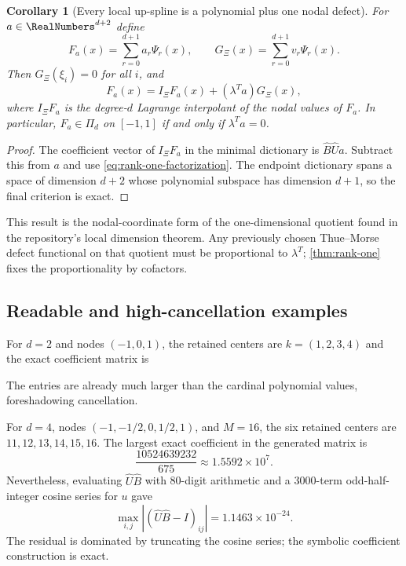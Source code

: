 \documentclass[11pt]{article}
\newtheorem{corollary}[theorem]{Corollary}
\theoremstyle{definition}
\theoremstyle{remark}
\newcommand{\PiD}{\Pi_d}
\begin{document}
\begin{corollary}[Every local up-spline is a polynomial plus one nodal defect]
\label{cor:functional-defect}
For $a\in\RealNumbers^{d+2}$ define
\[
 F_a(x)=\sum_{r=0}^{d+1}a_r\Psi_r(x),
 \qquad
 G_\Xi(x)=\sum_{r=0}^{d+1}v_r\Psi_r(x).
\]
Then $G_\Xi(\xi_i)=0$ for all $i$, and
\begin{equation}
 \boxed{
 F_a(x)=I_\Xi F_a(x)+(\lambda^Ta)G_\Xi(x),}
 \label{eq:functional-defect}
\end{equation}
where $I_\Xi F_a$ is the degree-$d$ Lagrange interpolant of the nodal values of
$F_a$.  In particular, $F_a\in\PiD$ on $[-1,1]$ if and only if
$\lambda^Ta=0$.
\end{corollary}

\begin{proof}
The coefficient vector of $I_\Xi F_a$ in the minimal dictionary is
$\widehat B\widehat Ua$.  Subtract this from $a$ and use
\eqref{eq:rank-one-factorization}.  The endpoint dictionary spans a space of
dimension $d+2$ whose polynomial subspace has dimension $d+1$, so the final
criterion is exact.
\end{proof}

This result is the nodal-coordinate form of the one-dimensional quotient found
in the repository's local dimension theorem.  Any previously chosen
Thue--Morse defect functional on that quotient must be proportional to
$\lambda^T$; \cref{thm:rank-one} fixes the proportionality by cofactors.

\subsection{Readable and high-cancellation examples}

For $d=2$ and nodes $(-1,0,1)$, the retained centers are $k=(1,2,3,4)$ and the
exact coefficient matrix is

The entries are already much larger than the cardinal polynomial values,
foreshadowing cancellation.

For $d=4$, nodes $(-1,-1/2,0,1/2,1)$, and $M=16$, the six retained centers are
$11,12,13,14,15,16$.  The largest exact coefficient in the generated matrix is
\[
 \frac{10524639232}{675}\approx1.5592\times10^7.
\]
Nevertheless, evaluating $\widehat U\widehat B$ with 80-digit arithmetic and a
3000-term odd-half-integer cosine series for $u$ gave
\[
 \max_{i,j}|(\widehat U\widehat B-I)_{ij}|
 =1.1463\times10^{-24}.
\]
The residual is dominated by truncating the cosine series; the symbolic
coefficient construction is exact.
\end{document}
